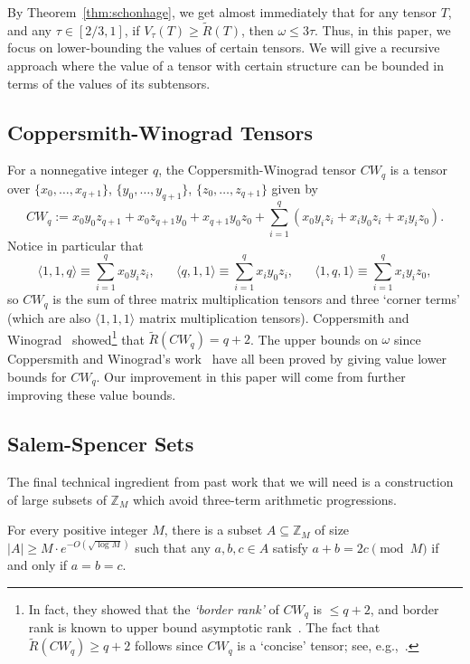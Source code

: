 \documentclass{theoretics}
\begin{document}
By Theorem~\ref{thm:schonhage}, we get almost immediately that for any tensor $T$, and any $\tau \in [2/3,1]$, if $V_\tau(T) \geq \tilde{R}(T)$, then $\omega \leq 3 \tau$. Thus, in this paper, we focus on lower-bounding the values of certain tensors. We will give a recursive approach where the value of a tensor with certain structure can be bounded in terms of the values of its subtensors.

\subsection{Coppersmith-Winograd Tensors}

For a nonnegative integer $q$, the Coppersmith-Winograd tensor $CW_q$ is a tensor over $\{x_0,\ldots,x_{q+1}\}$, $\{y_0, \ldots, y_{q+1}\}$, $\{z_0, \ldots, z_{q+1}\}$ given by $$CW_q := x_0 y_0 z_{q+1} + x_0 z_{q+1} y_0 + x_{q+1} y_0 z_0 + \sum_{i=1}^q (x_0 y_i z_i + x_i y_0 z_i + x_i y_i z_0).$$ 
Notice in particular that $$\langle 1,1,q \rangle \equiv \sum_{i=1}^q x_0 y_i z_i, \hspace{20pt} \langle q,1,1 \rangle \equiv \sum_{i=1}^q x_i y_0 z_i, \hspace{20pt} \langle 1,q,1 \rangle \equiv \sum_{i=1}^q x_i y_i z_0,$$
so $CW_q$ is the sum of three matrix multiplication tensors and three `corner terms' (which are also $\langle 1,1,1 \rangle$ matrix multiplication tensors). 
Coppersmith and Winograd~\cite{coppersmith} showed\footnote{In fact, they showed that the \emph{`border rank'} of $CW_q$ is $\leq q+2$, and border rank is known to upper bound asymptotic rank~\cite{bini1980border}. The fact that $\tilde{R}(CW_q) \geq q+2$ follows since $CW_q$ is a `concise' tensor; see, e.g.,~\cite[Remark 14.38]{burgisser2013algebraic}.} that $\tilde{R}(CW_q) = q+2$. The upper bounds on $\omega$ since Coppersmith and Winograd's work~\cite{coppersmith,stothers,v12,legall} have all been proved by giving value lower bounds for $CW_q$. Our improvement in this paper will come from further improving these value bounds.

\subsection{Salem-Spencer Sets}

The final technical ingredient from past work that we will need is a construction of large subsets of $\mathbb{Z}_M$ which avoid three-term arithmetic progressions.

\begin{theorem} \label{thm:SS}
For every positive integer $M$, there is a subset $A \subseteq \mathbb{Z}_M$ of size $|A| \geq M \cdot e^{-O(\sqrt{\log M})}$ such that any $a,b,c \in A$ satisfy $a+b=2c \pmod{M}$ if and only if $a=b=c$.
\end{theorem}
\end{document}
